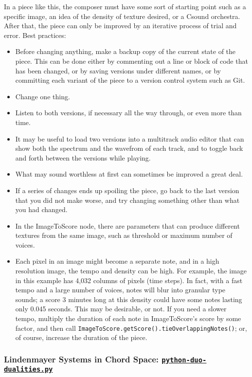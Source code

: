 \documentclass[letterpaper,10pt,DIV=12,parskip=half]{scrartcl}
\begin{document}
\begin{canaryframed}
In a piece like this, the composer must have some sort of starting point such as a specific image, an idea of the density of texture desired, or a Csound orchestra. After that, the piece can only be improved by an iterative process of trial and error. Best practices:
\begin{itemize}
\item Before changing anything, make a backup copy of the current state of the piece. This can be done either by commenting out a line or block of code that has been changed, or by saving versions under different names, or by committing each variant of the piece to a version control system such as Git.
\item Change one thing.
\item Listen to both versions, if necessary all the way through, or even more than time.
\item It may be useful to load two versions into a multitrack audio editor that can show both the spectrum and the wavefrom of each track, and to toggle back and forth between the versions while playing.
\item What may sound worthless at first can sometimes be improved a great deal.
\item If a series of changes ends up spoiling the piece, go back to the last version that you did not make worse, and try changing something other than what you had changed.
\item In the ImageToScore node, there are parameters that can produce different textures from the same image, such as threshold or maximum number of voices.
\item Each pixel in an image might become a separate note, and in a high resolution image, the tempo and density can be high. For example, the image in this example has 4,032 columns of pixels (time steps). In fact, with a fast tempo and a large number of voices, notes will blur into granular type sounds; a score 3 minutes long at this density could have some notes lasting only 0.045 seconds. This may be desirable, or not. If you need a slower tempo, multiply the duration of each note in ImageToScore's score by some factor, and then call \lstinline|ImageToScore.getScore().tieOverlappingNotes()|; or, of course, increase the duration of the piece.
\end{itemize}
\end{canaryframed}

\subsubsection{Lindenmayer Systems in Chord Space: \href{https://github.com/gogins/csound-ac/blob/master/user-guide/python-duo-dualities.py}{\lstinline|python-duo-dualities.py|}}
\end{document}

